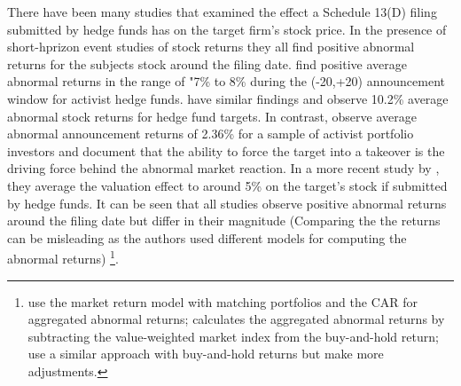 \documentclass[12pt]{article}
\begin{document}
There have been many studies that examined the effect a Schedule 13(D) filing submitted by hedge funds has on the target firm's stock price. In the presence of short-hprizon event studies of stock returns they all find positive abnormal returns for the subjects stock around the filing date. 
\citet[p.1730]{Brav2008} find positive average abnormal returns in the range of "7\% to 8\% during the (-20,+20) announcement window for activist hedge funds. \citet{Klein2009} have similar findings and observe 10.2\% average abnormal stock returns for hedge fund targets. In contrast, \citet{Greenwood2009} observe average abnormal announcement returns of 2.36\% for a sample of activist portfolio investors and document that the ability to force the target into a takeover is the driving force behind the abnormal market reaction. In a more recent study by \citet{Denes2017}, they average the valuation effect to around 5\% on the target's stock if submitted by hedge funds. It can be seen that all studies observe positive abnormal returns around the filing date but differ in their magnitude (Comparing the the returns can be misleading as the authors used different models for computing the abnormal returns)
	\footnote{\citet{Greenwood2009} use the market return model with matching portfolios and the CAR for aggregated abnormal returns; \citet{Brav2008} calculates the aggregated abnormal returns by subtracting the value-weighted market index from the buy-and-hold return; \citet{Klein2009} use a similar approach with buy-and-hold returns but make more adjustments.}.
\end{document}
